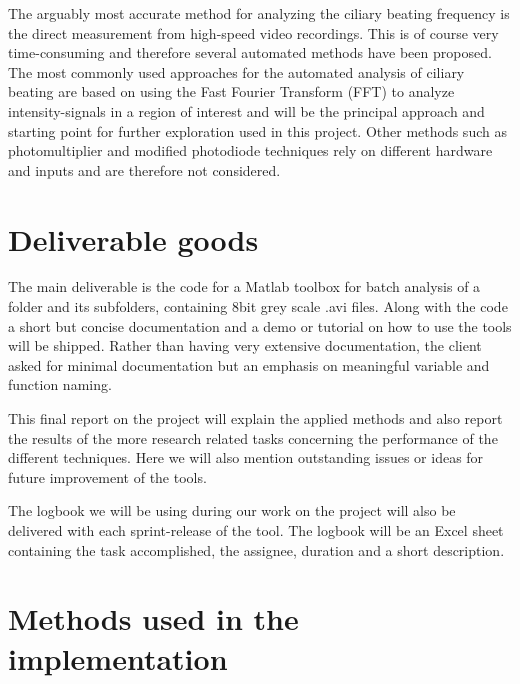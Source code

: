 \documentclass[11pt]{scrartcl}
\begin{document}
The arguably most accurate method for analyzing the ciliary beating frequency is the direct measurement from high-speed video recordings. This is of course very time-consuming and therefore several automated methods have been proposed. The most commonly used approaches for the automated analysis of ciliary beating are based on using the Fast Fourier Transform (FFT) to analyze intensity-signals in a region of interest and will be the principal approach and starting point for further exploration used in this project. Other methods such as photomultiplier and modified photodiode techniques rely on different hardware and inputs and are therefore not considered.


\section{Deliverable goods}

The main deliverable is the code for a Matlab toolbox for batch analysis of a folder and its subfolders,
containing 8bit grey scale .avi files.  Along with the code a short but concise documentation and a demo or
tutorial on how to use the tools will be shipped. Rather than having very extensive documentation, the client
asked for minimal documentation but an emphasis on meaningful variable and function naming.

This final report on the project will explain the applied methods and also report the results of the more
research related tasks concerning the performance of the different techniques. Here we will also mention
outstanding issues or ideas for future improvement of the tools.

The logbook we will be using during our work on the project will also be delivered with each sprint-release of
the tool. The logbook will be an Excel sheet containing the task accomplished, the assignee, duration and a
short description.



\section{Methods used in the implementation}
\end{document}
